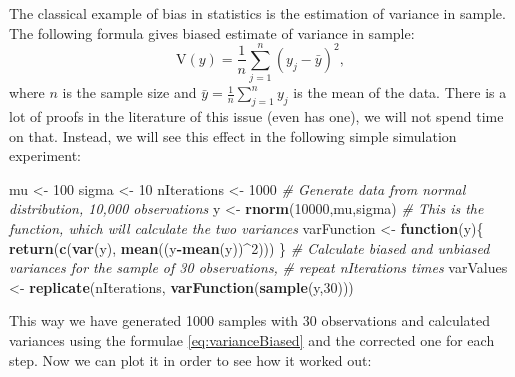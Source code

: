 \documentclass[
]{book}
\newenvironment{Shaded}{\begin{snugshade}}{\end{snugshade}}
\newcommand{\CommentTok}[1]{\textcolor[rgb]{0.56,0.35,0.01}{\textit{#1}}}
\newcommand{\ControlFlowTok}[1]{\textcolor[rgb]{0.13,0.29,0.53}{\textbf{#1}}}
\newcommand{\DecValTok}[1]{\textcolor[rgb]{0.00,0.00,0.81}{#1}}
\newcommand{\FunctionTok}[1]{\textcolor[rgb]{0.13,0.29,0.53}{\textbf{#1}}}
\newcommand{\NormalTok}[1]{#1}
\newcommand{\OtherTok}[1]{\textcolor[rgb]{0.56,0.35,0.01}{#1}}
\newcommand{\SpecialCharTok}[1]{\textcolor[rgb]{0.81,0.36,0.00}{\textbf{#1}}}
\theoremstyle{definition}
\theoremstyle{definition}
\theoremstyle{definition}
\theoremstyle{definition}
\theoremstyle{remark}
\begin{document}
The classical example of bias in statistics is the estimation of variance in sample. The following formula gives biased estimate of variance in sample:
\begin{equation}
    \mathrm{V}(y) = \frac{1}{n} \sum_{j=1}^n \left( y_j - \bar{y} \right)^2,
    \label{eq:varianceBiased}
\end{equation}
where \(n\) is the sample size and \(\bar{y} = \frac{1}{n} \sum_{j=1}^n y_j\) is the mean of the data. There is a lot of proofs in the literature of this issue (even \citet{WikipediaVarianceBias2020} has one), we will not spend time on that. Instead, we will see this effect in the following simple simulation experiment:

\begin{Shaded}
\begin{Highlighting}[]
\NormalTok{mu }\OtherTok{\textless{}{-}} \DecValTok{100}
\NormalTok{sigma }\OtherTok{\textless{}{-}} \DecValTok{10}
\NormalTok{nIterations }\OtherTok{\textless{}{-}} \DecValTok{1000}
\CommentTok{\# Generate data from normal distribution, 10,000 observations}
\NormalTok{y }\OtherTok{\textless{}{-}} \FunctionTok{rnorm}\NormalTok{(}\DecValTok{10000}\NormalTok{,mu,sigma)}
\CommentTok{\# This is the function, which will calculate the two variances}
\NormalTok{varFunction }\OtherTok{\textless{}{-}} \ControlFlowTok{function}\NormalTok{(y)\{}
   \FunctionTok{return}\NormalTok{(}\FunctionTok{c}\NormalTok{(}\FunctionTok{var}\NormalTok{(y), }\FunctionTok{mean}\NormalTok{((y}\SpecialCharTok{{-}}\FunctionTok{mean}\NormalTok{(y))}\SpecialCharTok{\^{}}\DecValTok{2}\NormalTok{)))}
\NormalTok{\}}
\CommentTok{\# Calculate biased and unbiased variances for the sample of 30 observations,}
\CommentTok{\# repeat nIterations times}
\NormalTok{varValues }\OtherTok{\textless{}{-}} \FunctionTok{replicate}\NormalTok{(nIterations, }\FunctionTok{varFunction}\NormalTok{(}\FunctionTok{sample}\NormalTok{(y,}\DecValTok{30}\NormalTok{)))}
\end{Highlighting}
\end{Shaded}

This way we have generated 1000 samples with 30 observations and calculated variances using the formulae \eqref{eq:varianceBiased} and the corrected one for each step. Now we can plot it in order to see how it worked out:
\end{document}
